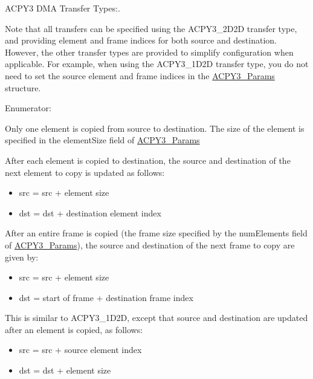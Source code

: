 ACPY3 DMA Transfer Types:. 

Note that all transfers can be specified using the ACPY3\_\-2D2D transfer type, and providing element and frame indices for both source and destination. However, the other transfer types are provided to simplify configuration when applicable. For example, when using the ACPY3\_\-1D2D transfer type, you do not need to set the source element and frame indices in the \hyperlink{struct_a_c_p_y3___params}{ACPY3\_\-Params} structure. \begin{Desc}
\item[Enumerator: ]\par
\begin{description}
\item[{\em 
\hypertarget{group___d_s_p_a_c_p_y3_ggbe2d02fcbde983c823b138f20667cbfcf9cef75ab1829399370006a48d16182e}{
ACPY3\_\-1D1D}
\label{group___d_s_p_a_c_p_y3_ggbe2d02fcbde983c823b138f20667cbfcf9cef75ab1829399370006a48d16182e}
}]Only one element is copied from source to destination. The size of the element is specified in the element\-Size field of \hyperlink{struct_a_c_p_y3___params}{ACPY3\_\-Params} \item[{\em 
\hypertarget{group___d_s_p_a_c_p_y3_ggbe2d02fcbde983c823b138f20667cbfc7e3376fb0def5e38484dfb121e7b2fb7}{
ACPY3\_\-1D2D}
\label{group___d_s_p_a_c_p_y3_ggbe2d02fcbde983c823b138f20667cbfc7e3376fb0def5e38484dfb121e7b2fb7}
}]After each element is copied to destination, the source and destination of the next element to copy is updated as follows:\begin{itemize}
\item src = src + element size\item dst = dst + destination element index\end{itemize}


After an entire frame is copied (the frame size specified by the num\-Elements field of \hyperlink{struct_a_c_p_y3___params}{ACPY3\_\-Params}), the source and destination of the next frame to copy are given by:\begin{itemize}
\item src = src + element size\item dst = start of frame + destination frame index \end{itemize}
\item[{\em 
\hypertarget{group___d_s_p_a_c_p_y3_ggbe2d02fcbde983c823b138f20667cbfc3ad50651b016c2c96f8fb6f724213623}{
ACPY3\_\-2D1D}
\label{group___d_s_p_a_c_p_y3_ggbe2d02fcbde983c823b138f20667cbfc3ad50651b016c2c96f8fb6f724213623}
}]This is similar to ACPY3\_\-1D2D, except that source and destination are updated after an element is copied, as follows:\begin{itemize}
\item src = src + source element index\item dst = dst + element size\end{itemize}



\end{description}
\end{Desc}
